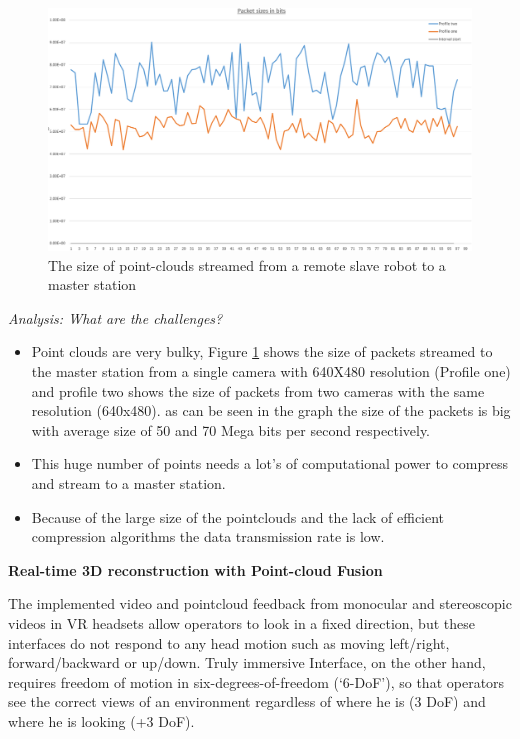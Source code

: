 \begin{figure}[h]
    \centering
    \includegraphics[scale=0.3]{images/wireshark_general.jpg}
    \caption{The size of point-clouds streamed from a remote slave robot to a master station }
    \label{fig:dataPipe}
\end{figure}

\textit{Analysis: What are the challenges?}
\begin{itemize}
    \item Point clouds are very bulky, Figure \ref{fig:dataPipe} shows the size of packets streamed to the master station from a single camera with 640X480 resolution (Profile one) and profile two shows the size of packets from two cameras with the same resolution (640x480). as can be seen in the graph the size of the packets is big with average size of  50 and 70 Mega bits per second respectively.
    \item This huge number of points needs a lot's of computational power to compress and stream to a master station.
    \item Because of the large size of the pointclouds and the lack of efficient compression algorithms the data transmission rate is low.
\end{itemize}


\textbf{Real-time 3D reconstruction with Point-cloud Fusion}

The implemented video and pointcloud feedback from monocular and stereoscopic videos in VR headsets allow operators to look in a fixed direction, but these interfaces do not respond to any head motion such as moving left/right, forward/backward or up/down. Truly immersive Interface, on the other hand, requires freedom of motion in six-degrees-of-freedom (‘6-DoF’), so that operators see the correct views of an environment regardless of where he is (3 DoF) and where he is looking (+3 DoF).

